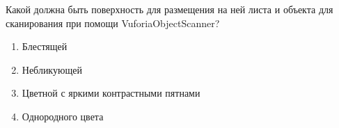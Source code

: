 
Какой должна быть поверхность для размещения на ней листа и объекта для сканирования при помощи VuforiaObjectScanner?

\begin{enumerate}
    \item Блестящей
    \item Небликующей
    \item Цветной с яркими контрастными пятнами
    \item Однородного цвета
\end{enumerate}